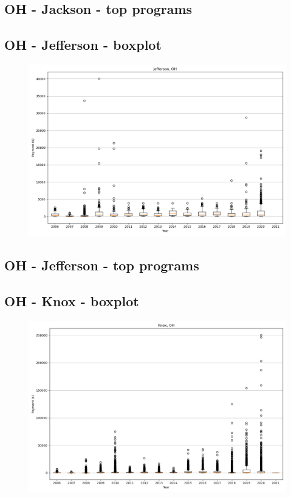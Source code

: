 \subsection*{OH - Jackson - top programs}

\newpage
\subsection*{OH - Jefferson - boxplot}
\begin{figure}[h]
\centering
\includegraphics[width=7in]{../output/boxplots/counties/Jefferson-OH_boxplot.png}
\end{figure}


\subsection*{OH - Jefferson - top programs}

\newpage
\subsection*{OH - Knox - boxplot}
\begin{figure}[h]
\centering
\includegraphics[width=7in]{../output/boxplots/counties/Knox-OH_boxplot.png}
\end{figure}


